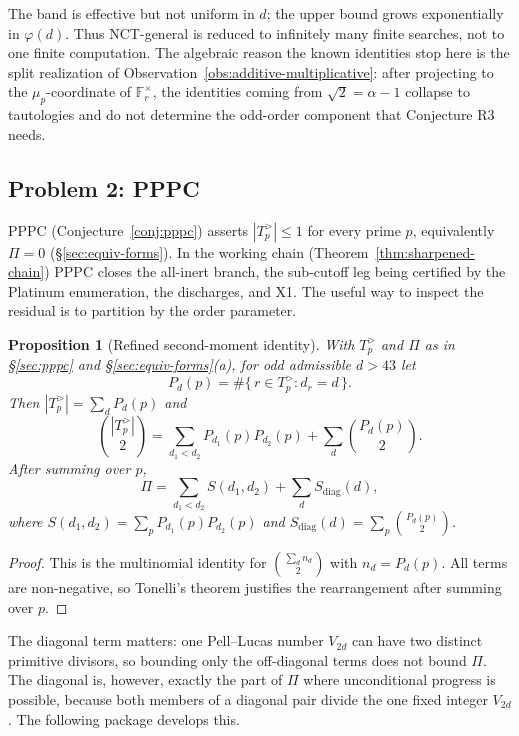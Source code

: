 \documentclass[11pt]{amsart}
\theoremstyle{plain}
\newtheorem{proposition}[theorem]{Proposition}
\theoremstyle{definition}
\theoremstyle{remark}
\numberwithin{equation}{section}
\newcommand{\F}{\mathbb{F}}
\begin{document}
The band is effective but not uniform in $d$; the upper bound grows exponentially in $\varphi(d)$. Thus NCT-general is reduced to infinitely many finite searches, not to one finite computation. The algebraic reason the known identities stop here is the split realization of Observation~\ref{obs:additive-multiplicative}: after projecting to the $\mu_p$-coordinate of $\F_r^\times$, the identities coming from $\sqrt2=\alpha-1$ collapse to tautologies and do not determine the odd-order component that Conjecture R3 needs.

\subsection{Problem 2: PPPC}\label{sec:pppc-problem}

PPPC (Conjecture~\ref{conj:pppc}) asserts $|T_p^{>}|\leq 1$ for every prime $p$, equivalently $\Pi=0$ (\S\ref{sec:equiv-forms}). In the working chain (Theorem~\ref{thm:sharpened-chain}) PPPC closes the all-inert branch, the sub-cutoff leg being certified by the Platinum enumeration, the discharges, and X1. The useful way to inspect the residual is to partition by the order parameter.

\begin{proposition}[Refined second-moment identity]\label{prop:refined-second-moment}
With $T_p^{>}$ and $\Pi$ as in \S\ref{sec:pppc} and \S\ref{sec:equiv-forms}(a), for odd admissible $d>43$ let
\[
  P_d(p)=\#\{\,r\in T_p^{>}: d_r=d\,\}.
\]
Then $|T_p^{>}|=\sum_d P_d(p)$ and
\[
  \binom{|T_p^{>}|}{2}
  =\sum_{d_1<d_2}P_{d_1}(p)P_{d_2}(p)
   +\sum_d \binom{P_d(p)}{2}.
\]
After summing over $p$,
\[
  \Pi=\sum_{d_1<d_2}S(d_1,d_2)+\sum_d S_{\mathrm{diag}}(d),
\]
where $S(d_1,d_2)=\sum_pP_{d_1}(p)P_{d_2}(p)$ and $S_{\mathrm{diag}}(d)=\sum_p\binom{P_d(p)}{2}$.
\end{proposition}

\begin{proof}
This is the multinomial identity for $\binom{\sum_d n_d}{2}$ with $n_d=P_d(p)$. All terms are non-negative, so Tonelli's theorem justifies the rearrangement after summing over $p$.
\end{proof}

The diagonal term matters: one Pell--Lucas number $V_{2d}$ can have two distinct primitive divisors, so bounding only the off-diagonal terms does not bound $\Pi$. The diagonal is, however, exactly the part of $\Pi$ where unconditional progress is possible, because both members of a diagonal pair divide the one fixed integer $V_{2d}$. The following package develops this.
\end{document}
